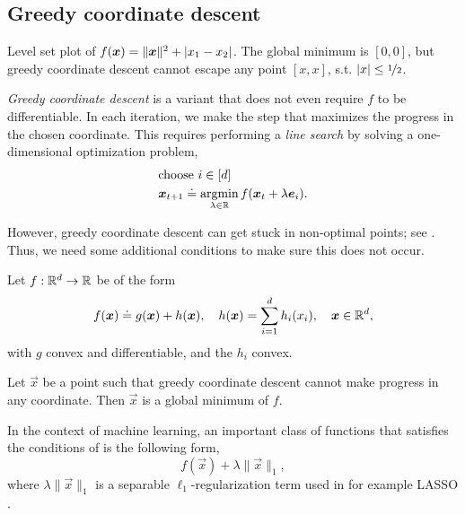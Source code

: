 \subsection{Greedy coordinate descent}

\begin{marginfigure}
    \centering
    \caption{Level set plot of $f(\bm{x}) = \| \bm{x} \|^2 + \lvert x_1 - x_2\rvert$. The global minimum is $[0,0]$, but greedy coordinate descent cannot escape any point $[x, x]$, s.t. $|x| \leq \nicefrac{1}{2}$.}
    \label{fig:greedy-fail}
\end{marginfigure}

\textit{Greedy coordinate descent} is a variant that does not even require $f$ to be differentiable.
In each iteration, we make the step that maximizes the progress in the chosen coordinate. This
requires performing a \textit{line search} by solving a one-dimensional optimization problem,
\begin{align*}
     & \text{choose $i \in [d]$}                                                       \\
     & \bm{x}_{t+1} \doteq \operatorname*{argmin}_{\lambda \in \mathbb{R}} f(\bm{x}_t + \lambda \bm{e}_i).
\end{align*}

However, greedy coordinate descent can get stuck in non-optimal points; see .
Thus, we need some additional conditions to make sure this does not occur.

\begin{theorem} \label{thm:separable}
    Let $f: \mathbb{R}^d \to \mathbb{R}$ be of the form \[
        f(\bm{x}) \doteq g(\bm{x}) + h(\bm{x}), \quad h(\bm{x}) = \sum_{i=1}^{d} h_i(x_i), \quad \bm{x} \in \mathbb{R}^d,
    \]
    with $g$ convex and differentiable, and the $h_i$ convex.

    Let $\vec{x}$ be a point such that greedy coordinate descent cannot make progress in any
    coordinate. Then $\vec{x}$ is a global minimum of $f$.
\end{theorem}

In the context of machine learning, an important class of functions that satisfies the conditions
of  is the following form, \[
    f(\vec{x}) + \lambda \| \vec{x} \|_1,
\]
where $\lambda \| \vec{x} \|_1$ is a separable $\ell_1$-regularization term used in for example
LASSO \citep{tibshirani1996regression}.
